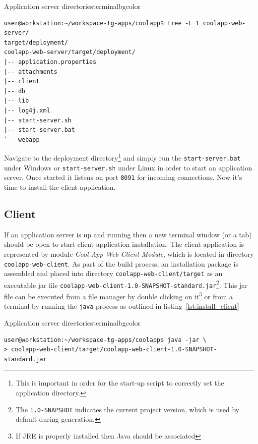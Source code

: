   \begin{code}{Application server directories}{\label{lst:app_server}}{terminalbgcolor}
     \begin{lstlisting}
user@workstation:~/workspace-tg-apps/coolapp$ tree -L 1 coolapp-web-server/
target/deployment/
coolapp-web-server/target/deployment/
|-- application.properties
|-- attachments
|-- client
|-- db
|-- lib
|-- log4j.xml
|-- start-server.sh
|-- start-server.bat
`-- webapp
     \end{lstlisting}
  \end{code}

  Navigate to the deployment directory\footnote{This is important in order for the start-up script to correctly set the application directory.} and simply run the \texttt{start-server.bat} under Windows or \texttt{start-server.sh} under Linux in order to start an application server.
  Once started it listens on port \texttt{8091} for incoming connections.
  Now it's time to install the client application.

\subsection{Client}\label{ch00:02:client}
  \sloppypar
  If an application server is up and running then a new terminal window (or a tab) should be open to start client application installation.
  The client application is represented by module \emph{Cool App Web Client Module}, which is located in directory \texttt{coolapp-web-client}.
  As part of the build process, an installation package is assembled and placed into directory \texttt{coolapp-web-client/target} as an executable jar file \texttt{coolapp-web-client-1.0-SNAPSHOT-standard.jar}\footnote{The \texttt{1.0-SNAPSHOT} indicates the current project version, which is used by default during generation.}.   
  This jar file can be executed from a file manager by double clicking on it\footnote{If JRE is properly installed then Java should be associated} or from a terminal by running the \texttt{java} process as outlined in listing~\ref{lst:install_client}

  \begin{code}{Application server directories}{\label{lst:install_client}}{terminalbgcolor}
     \begin{lstlisting}
user@workstation:~/workspace-tg-apps/coolapp$ java -jar \
> coolapp-web-client/target/coolapp-web-client-1.0-SNAPSHOT-standard.jar
     \end{lstlisting}
  \end{code}

